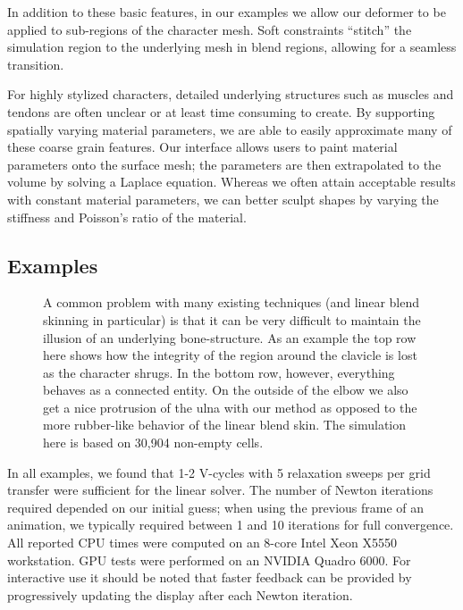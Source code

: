 In addition to these basic features, in our examples we allow our deformer to be applied to sub-regions of the character mesh. Soft constraints ``stitch'' the simulation region to the underlying mesh in blend regions, allowing for a seamless transition.  

For highly stylized characters, detailed underlying structures such as muscles and tendons are often unclear or at least time consuming to create. By supporting spatially varying material parameters, we are able to easily approximate many of these coarse grain features.  Our interface allows users to paint material parameters onto the surface mesh; the parameters are then extrapolated to the volume by solving a Laplace equation.  Whereas we often attain acceptable results with constant material parameters, we can better sculpt shapes by varying the stiffness and Poisson's ratio of the material.

\subsection{Examples}
\begin{figure}[tb]
\caption[A comparison with linear blend skinning on a character arm
  and shoulder.]{A common problem with many existing techniques (and linear blend
  skinning in particular) is that it can be very difficult to maintain the
  illusion of an underlying bone-structure. As an example the top row here shows
  how the integrity of the region around the clavicle is lost as the character
  shrugs. In the bottom row, however, everything behaves as a connected
  entity. On the outside of the elbow we also get a nice protrusion of the ulna
  with our method as opposed to the more rubber-like behavior of the linear
  blend skin. The simulation here is based on 30,904 non-empty cells.}
\label{fig:thug}
\end{figure}
In all examples, we found that 1-2 V-cycles with 5 relaxation sweeps
per grid transfer were sufficient for the linear solver.  The number
of Newton iterations required depended on our initial guess; when
using the previous frame of an animation, we typically required
between 1 and 10 iterations for full convergence.  All reported CPU
times were computed on an 8-core Intel Xeon X5550 workstation.  GPU
tests were performed on an NVIDIA Quadro 6000. For interactive use it
should be noted that faster feedback can be provided by progressively
updating the display after each Newton iteration.

